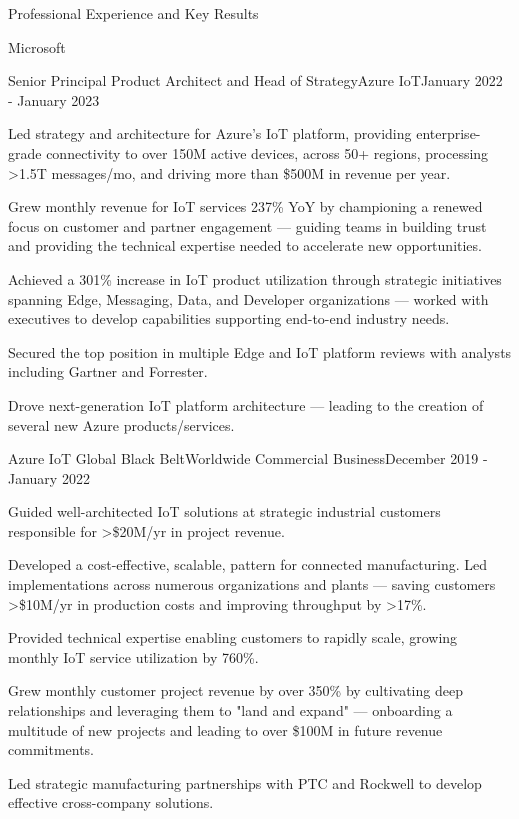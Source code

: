 \documentclass{resume} %
\begin{document}
\begin{rSection}{Professional Experience and Key Results}
  \begin{rCompany}{Microsoft}{}{}
     \begin{rRole}{Senior Principal Product Architect and Head of Strategy}{Azure IoT}{January 2022 - January 2023}
        \item Led strategy and architecture for Azure's IoT platform, providing enterprise-grade connectivity to over 150M active devices, across 50+ regions, processing >1.5T messages/mo, and driving more than \$500M in revenue per year.
        \item Grew monthly revenue for IoT services 237\% YoY by championing a renewed focus on customer and partner engagement --- guiding teams in building trust and providing the technical expertise needed to accelerate new opportunities.
        \item Achieved a 301\% increase in IoT product utilization through strategic initiatives spanning Edge, Messaging, Data, and Developer organizations --- worked with executives to develop capabilities supporting end-to-end industry needs.
        \item Secured the top position in multiple Edge and IoT platform reviews with analysts including Gartner and Forrester.
        \item Drove next-generation IoT platform architecture --- leading to the creation of several new Azure products/services.
    
    \end{rRole}
    
    \begin{rRole}{Azure IoT Global Black Belt}{Worldwide Commercial Business}{December 2019 - January 2022}
        \item Guided well-architected IoT solutions at strategic industrial customers responsible for >\$20M/yr in project revenue. 
        \item Developed a cost-effective, scalable, pattern for connected manufacturing. Led implementations across numerous organizations and plants --- saving customers >\$10M/yr in production costs and improving throughput by >17\%. 
        \item Provided technical expertise enabling customers to rapidly scale, growing monthly IoT service utilization by 760\%.
        \item Grew monthly customer project revenue by over 350\% by cultivating deep relationships and leveraging them to "land and expand" --- onboarding a multitude of new projects and leading to over \$100M in future revenue commitments.\
        \item Led strategic manufacturing partnerships with PTC and Rockwell to develop effective cross-company solutions.
    \end{rRole}
    

\end{rCompany}
\end{rSection}
\end{document}
